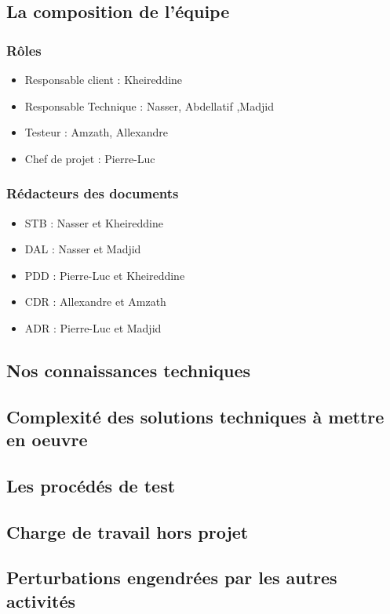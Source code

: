 \documentclass{../res/univ-projet}
\begin{document}
  \subsection{La composition de l'équipe}
    \subsubsection{Rôles}
      \begin{itemize}
        \item Responsable client : Kheireddine
        \item Responsable Technique : Nasser, Abdellatif ,Madjid
        \item Testeur : Amzath, Allexandre
        \item Chef de projet : Pierre-Luc
      \end{itemize}
    \subsubsection{Rédacteurs des documents}
      \begin{itemize}
        \item STB : Nasser et Kheireddine
        \item DAL : Nasser et Madjid
        \item PDD : Pierre-Luc et Kheireddine
        \item CDR : Allexandre et Amzath
        \item ADR : Pierre-Luc et Madjid
      \end{itemize}
  \subsection{Nos connaissances techniques}
  \subsection{Complexité des solutions techniques à mettre en oeuvre}
  \subsection{Les procédés de test}
  \subsection{Charge de travail hors projet}
  \subsection{Perturbations engendrées par les autres activités}
  
\end{document}
